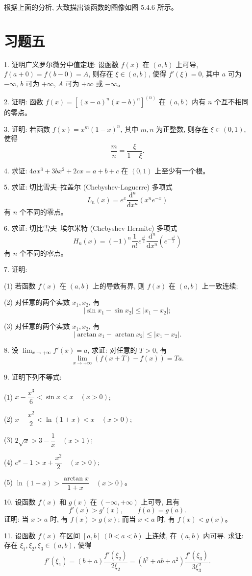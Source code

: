 \documentclass[UTF8, 12pt, fontset=fandol, oneside]{ctexart}
\begin{document}
根据上面的分析, 大致描出该函数的图像如图 5.4.6 所示。

\section*{习题五}

1. 证明广义罗尔微分中值定理: 设函数 $f(x)$ 在 $(a,b)$ 上可导, $f(a+0)=f(b-0)=A$, 则存在 $\xi\in(a,b)$, 使得 $f'(\xi)=0$, 其中 $a$ 可为 $-\infty$, $b$ 可为 $+\infty$, $A$ 可为 $+\infty$ 或 $-\infty$。

2. 证明: 函数 $f(x)=[(x-a)^n(x-b)^n]^{(n)}$ 在 $(a,b)$ 内有 $n$ 个互不相同的零点。

3. 证明: 若函数 $f(x)=x^m(1-x)^n$, 其中 $m,n$ 为正整数, 则存在 $\xi\in(0,1)$, 使得
\[
  \frac mn=\frac{\xi}{1-\xi}.
\]

4. 求证: $4ax^3+3bx^2+2cx=a+b+c$ 在 $(0,1)$ 上至少有一个根。

5. 求证: 切比雪夫--拉盖尔 (Chebyshev-Laguerre) 多项式
\[
  L_n(x)=e^x\frac{\mathrm d^n}{\mathrm dx^n}(x^ne^{-x})
\]
有 $n$ 个不同的零点。

6. 求证: 切比雪夫--埃尔米特 (Chebyshev-Hermite) 多项式
\[
  H_n(x)=(-1)^n\frac1{n!}e^{\frac{x^2}2}\frac{\mathrm d^n}{\mathrm dx^n}\left(e^{-\frac{x^2}2}\right)
\]
有 $n$ 个不同的零点。

7. 证明:

(1) 若函数 $f(x)$ 在 $(a,b)$ 上的导数有界, 则 $f(x)$ 在 $(a,b)$ 上一致连续;

(2) 对任意的两个实数 $x_1,x_2$, 有
\[
  |\sin x_1-\sin x_2|\le |x_1-x_2|;
\]

(3) 对任意的两个实数 $x_1,x_2$, 有
\[
  |\arctan x_1-\arctan x_2|\le |x_1-x_2|.
\]

8. 设 $\lim_{x\to+\infty}f'(x)=a$, 求证: 对任意的 $T>0$, 有
\[
  \lim_{x\to+\infty}(f(x+T)-f(x))=Ta.
\]

9. 证明下列不等式:

(1) $x-\dfrac{x^3}6<\sin x<x\quad (x>0)$;

(2) $x-\dfrac{x^2}2<\ln(1+x)<x\quad (x>0)$;

(3) $2\sqrt x>3-\dfrac1x\quad (x>1)$;

(4) $e^x-1>x+\dfrac{x^2}2\quad (x>0)$;

(5) $\ln(1+x)>\dfrac{\arctan x}{1+x}\quad (x>0)$。

10. 设函数 $f(x)$ 和 $g(x)$ 在 $(-\infty,+\infty)$ 上可导, 且有
\[
  f'(x)>g'(x),\qquad f(a)=g(a).
\]
证明: 当 $x>a$ 时, 有 $f(x)>g(x)$; 而当 $x<a$ 时, 有 $f(x)<g(x)$。

11. 设函数 $f(x)$ 在区间 $[a,b]\ (0<a<b)$ 上连续, 在 $(a,b)$ 内可导. 求证: 存在 $\xi_1,\xi_2,\xi_3\in(a,b)$, 使得
\[
  f'(\xi_1)=(b+a)\frac{f'(\xi_2)}{2\xi_2}
  =(b^2+ab+a^2)\frac{f'(\xi_3)}{3\xi_3^2}.
\]
\end{document}
